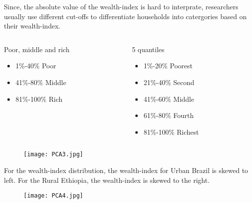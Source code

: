 \documentclass[13pt]{beamer}
\begin{document}
\begin{frame}
	Since, the absolute value of the wealth-index is hard to interprate, researchers usually use different cut-offs to differentiate households into catergories based on their wealth-index.
		\begin{columns}
		\begin{column}{0.45\textwidth}
			\begin{block}{Poor, middle and rich}
				\begin{minipage}[c][0.4\textheight][c]{\linewidth}
					\begin{itemize}
						\item 1\%-40\% Poor
						\item 41\%-80\% Middle
						\item 81\%-100\% Rich
					\end{itemize}
				\end{minipage}
			\end{block}
		\end{column}
		\begin{column}{0.45\textwidth}
			\begin{block}{5 quantiles}
				\begin{minipage}[c][0.4\textheight][c]{\linewidth}
					\begin{itemize}
						\item 1\%-20\% Poorest 
						\item 21\%-40\% Second
						\item 41\%-60\% Middle
						\item 61\%-80\% Fourth
						\item 81\%-100\% Richest
					\end{itemize}
				\end{minipage}
			\end{block}
		\end{column}
	\end{columns}
\end{frame}
\begin{frame}
	\begin{figure}[!ht]
		\texttt{[image: PCA3.jpg]}
	\end{figure}
\end{frame}
\begin{frame}
	For the wealth-index distribution, the wealth-index for Urban Brazil is skewed to left. For the Rural Ethiopia, the wealth-index is skewed to the right.
	\begin{figure}[!ht]
		\texttt{[image: PCA4.jpg]}
	\end{figure}
\end{frame}
\end{document}
